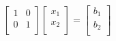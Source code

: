 \documentclass{article}
\begin{document}
  \begin{equation*}
  \left[
    \begin{array}{cc}
     1 & 0 \\
     0 & 1 \\
    \end{array}
  \right]
  \left[
    \begin{array}{c}
     x_{1} \\
     x_{2} \\
    \end{array}
  \right] =
  \left[
    \begin{array}{c}
     b_{1} \\
     b_{2} \\
    \end{array}
  \right]
  \end{equation*}
 
\end{document}
